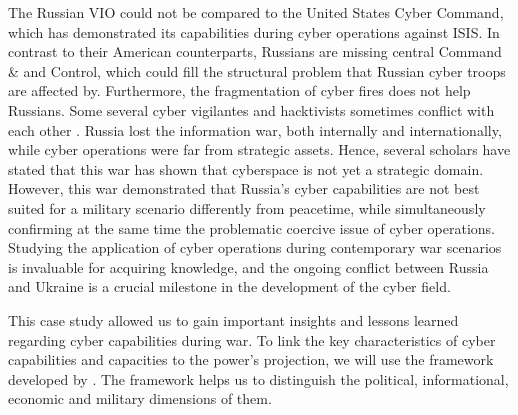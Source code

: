 The Russian VIO could not be compared to the United States Cyber Command, which has demonstrated its capabilities during cyber operations against ISIS. In contrast to their American counterparts, Russians are missing central Command \& and Control, which could fill the structural problem that Russian cyber troops are affected by. Furthermore, the fragmentation of cyber fires does not help Russians. Some several cyber vigilantes and hacktivists sometimes conflict with each other \autocite{cyberpeaceinstitute_2023_cyber}. Russia lost the information war, both internally and internationally, while cyber operations were far from strategic assets. Hence, several scholars have stated that this war has shown that cyberspace is not yet a strategic domain. However, this war demonstrated that Russia’s cyber capabilities are not best suited for a military scenario differently from peacetime, while simultaneously confirming at the same time the problematic coercive issue of cyber operations. Studying the application of cyber operations during contemporary war scenarios is invaluable for acquiring knowledge, and the ongoing conflict between Russia and Ukraine is a crucial milestone in the development of the cyber field.

 
This case study allowed us to gain important insights and lessons learned regarding cyber capabilities during war. To link the key characteristics of cyber capabilities and capacities to the power’s projection, we will use the framework developed by \textcite{vanhaaster_2016_assessing}. The framework helps us to distinguish the political, informational, economic and military dimensions of them. 

